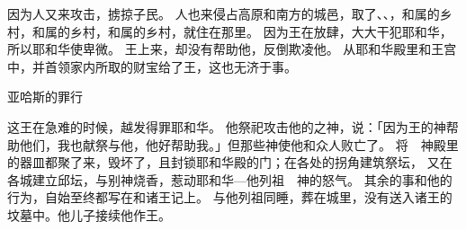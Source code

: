 {因为{}人又来攻击{}，掳掠子民。
人也来侵占高原和{}南方的城邑，取了{}、{}、{}，{}和属{}的乡村，{}和属{}的乡村，{}和属{}的乡村，就住在那里。
因为{}王{}在{}放肆，大大干犯耶和华，所以耶和华使{}卑微。
王{}上来，却没有帮助他，反倒欺凌他。
从耶和华殿里和王宫中，并首领家内所取的财宝给了{}王，这也无济于事。
\par }{\SH 亚哈斯的罪行
\par }{\PP {}这{}王在急难的时候，越发得罪耶和华。
他祭祀攻击他的{}之神，说：「因为{}王的神帮助他们，我也献祭与他，他好帮助我。」但那些神使他和{}众人败亡了。
将　神殿里的器皿都聚了来，毁坏了，且封锁耶和华殿的门；在{}各处的拐角建筑祭坛，
又在{}各城建立邱坛，与别神烧香，惹动耶和华—他列祖　神的怒气。
其余的事和他的行为，自始至终都写在{}和{}诸王记上。
与他列祖同睡，葬在{}城里，没有送入{}诸王的坟墓中。他儿子{}接续他作王。

}
